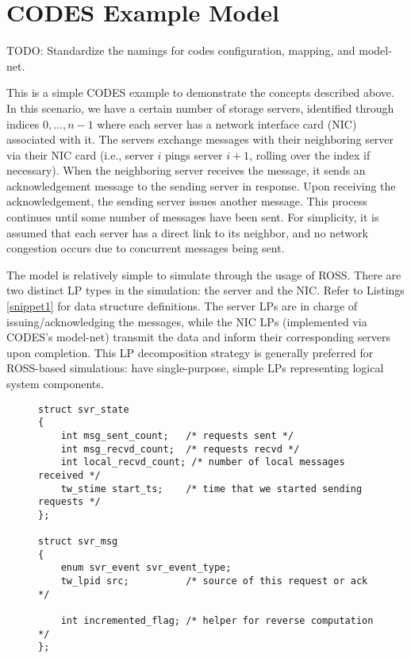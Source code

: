 \documentclass[conference,10pt,compsocconf,onecolumn]{IEEEtran}
\begin{document}
\section{CODES Example Model}

TODO: Standardize the namings for codes configuration, mapping, and model-net.

This is a simple CODES example to demonstrate the concepts described above.  In
this scenario, we have a certain number of storage servers, identified
through indices $0,\ldots, n-1$ where each server has a network interface card
(NIC) associated with it. The servers exchange messages with their neighboring
server via their NIC card (i.e., server $i$ pings server $i+1$, rolling over the
index if necessary). When the neighboring server receives the message, it sends
an acknowledgement message to the sending server in response. Upon receiving the
acknowledgement, the sending server issues another message. This process continues until
some number of messages have been sent. For simplicity, it is assumed that each
server has a direct link to its neighbor, and no network congestion occurs due
to concurrent messages being sent.

The model is relatively simple to simulate through the usage of ROSS. There are
two distinct LP types in the simulation: the server and the NIC. Refer to
Listings \ref{snippet1} for data structure definitions. The server LPs
are in charge of issuing/acknowledging the messages, while the NIC LPs
(implemented via CODES's model-net) transmit the data and inform their
corresponding servers upon completion. This LP decomposition strategy is
generally preferred for ROSS-based simulations: have single-purpose, simple LPs
representing logical system components.

\begin{figure}
\begin{lstlisting}[caption=Server state and event message struct, label=snippet1]
struct svr_state
{
    int msg_sent_count;   /* requests sent */
    int msg_recvd_count;  /* requests recvd */
    int local_recvd_count; /* number of local messages received */
    tw_stime start_ts;    /* time that we started sending requests */
};

struct svr_msg
{
    enum svr_event svr_event_type;
    tw_lpid src;          /* source of this request or ack */

    int incremented_flag; /* helper for reverse computation */
};

\end{lstlisting}
\end{figure}
\end{document}
